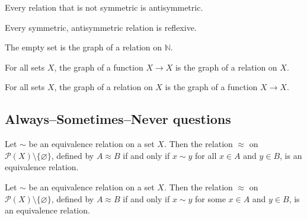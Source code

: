 \begin{chapex} %
Every relation that is not symmetric is antisymmetric.
\end{chapex}

\begin{chapex} %
Every symmetric, antisymmetric relation is reflexive.
\end{chapex}

\begin{chapex} %
The empty set is the graph of a relation on $\mathbb{N}$.
\end{chapex}

\begin{chapex} %
For all sets $X$, the graph of a function $X \to X$ is the graph of a relation on $X$.
\end{chapex}

\begin{chapex} %
\label{cqRelationsTFEnd}
For all sets $X$, the graph of a relation on $X$ is the graph of a function $X \to X$.
\end{chapex}

\subsection*{Always--Sometimes--Never questions}


\begin{chapex} %
\label{cqRelationsASNBegin}
Let $\sim$ be an equivalence relation on a set $X$. Then the relation $\approx$ on $\mathcal{P}(X) \setminus \{ \varnothing \}$, defined by $A \approx B$ if and only if $x \sim y$ for all $x \in A$ and $y \in B$, is an equivalence relation.
\end{chapex}

\begin{chapex} %
\label{cqRelationsASNEnd}
Let $\sim$ be an equivalence relation on a set $X$. Then the relation $\approx$ on $\mathcal{P}(X) \setminus \{ \varnothing \}$, defined by $A \approx B$ if and only if $x \sim y$ for some $x \in A$ and $y \in B$, is an equivalence relation.
\end{chapex}